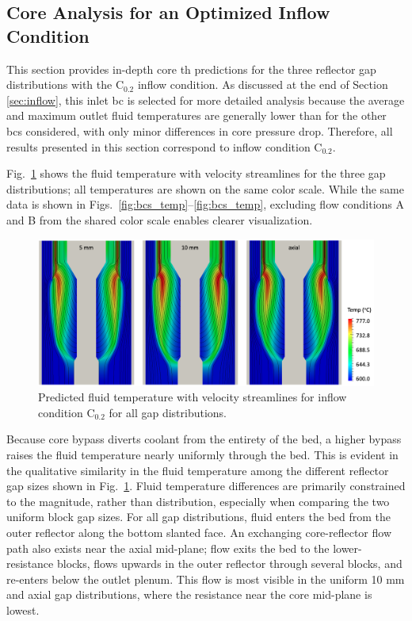 \subsection{Core Analysis for an Optimized Inflow Condition}
\label{sec:depth}

This section provides in-depth core \gls{th} predictions for the three reflector gap distributions with the C$_\text{0.2}$ inflow condition. As discussed at the end of Section \ref{sec:inflow}, this inlet \gls{bc} is selected for more detailed analysis because the average and maximum outlet fluid temperatures are generally lower than for the other \glspl{bc} considered, with only minor differences in core pressure drop. Therefore, all results presented in this section correspond to inflow condition C$_\text{0.2}$.

Fig.\ \ref{fig:fluid_temp_all} shows the fluid temperature with velocity streamlines for the three gap distributions; all temperatures are shown on the same color scale. While the same data is shown in Figs.\ \ref{fig:bcs_temp}--\ref{fig:bcs_temp}, excluding flow conditions A and B from the shared color scale enables clearer visualization. 

\begin{figure}[h!]
\centering
\includegraphics[width=0.9\linewidth]{figs/fluid_temp_all.png}
\caption{Predicted fluid temperature with velocity streamlines for inflow condition C$_\text{0.2}$ for all gap distributions.}
\label{fig:fluid_temp_all}
\end{figure}

Because core bypass diverts coolant from the entirety of the bed, a higher bypass raises the fluid temperature nearly uniformly through the bed. This is evident in the qualitative similarity in the fluid temperature among the different reflector gap sizes shown in Fig.\ \ref{fig:fluid_temp_all}. Fluid temperature differences are primarily constrained to the magnitude, rather than distribution, especially when comparing the two uniform block gap sizes. For all gap distributions, fluid enters the bed from the outer reflector along the bottom slanted face. An exchanging core-reflector flow path also exists near the axial mid-plane; flow exits the bed to the lower-resistance blocks, flows upwards in the outer reflector through several blocks, and re-enters below the outlet plenum. This flow is most visible in the uniform 10 \si{\milli\meter} and axial gap distributions, where the resistance near the core mid-plane is lowest.

